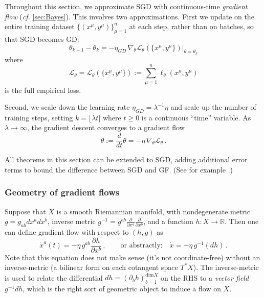 \documentclass[11pt]{article}
\newcommand{\R}{\mathbb{R}}
\newcommand{\CL}{{\mathcal L}}
\begin{document}
Throughout this section, we approximate SGD with continuous-time \emph{gradient flow} (\emph{cf.} \cref{sec:Bayes}). This involves two approximations. First we update on the entire training dataset $\{(x^\mu,y^\mu)\}_{\mu=1}^n$ at each step, rather than on batches, so that SGD becomes GD:
%
\begin{equation}
    \theta_{k+1} - \theta_k = -  \eta_{GD}\, \nabla_\theta \CL_\theta(\{x^\mu,y^\mu\}) \big|_{\theta=\theta_k}
\end{equation}
%
where
%
\begin{equation} \CL_\theta = \CL_\theta(\{x^\mu,y^\mu\}) := \sum_{\mu=1}^n \ell_\theta(x^\mu,y^\mu) \label{ell} \end{equation}
%
is the full empirical loss.

Second, we scale down the learning rate $\eta_{GD}=\lambda^{-1}\eta$ and scale up the number of training steps, setting $k = \lfloor \lambda t]$ where $t\geq 0$ is a continuous ``time'' variable. As $\lambda\to\infty$, the gradient descent converges to a gradient flow
%
\begin{equation}
    \dot\theta := \frac{d}{dt} \theta = - \eta\, \nabla_\theta \CL_\theta\,.
\end{equation}

All theorems in this section can be extended to SGD, adding additional error terms to bound the difference between SGD and GF. (See for example \cite[Chapter 19]{spiliopoulos2025foundations}.)

\subsubsection{Geometry of gradient flows}
\label{sec:geom-grads}

Suppose that $X$ is a smooth Riemannian manifold, with nondegenerate metric $g = g_{ab}dx^a dx^b$, inverse metric $g^{-1} = g^{ab}\frac{\partial}{\partial x^a}\frac{\partial}{\partial x^b}$, and a function $h:X\to \R$. Then one can define gradient flow with respect to $(h,g)$ as
%
\begin{equation} \dot x^a(t) = -\eta\, g^{ab} \frac{\partial h}{\partial x^b}\,, \qquad \text{or abstractly:}\quad \dot x = -\eta\, g^{-1}(dh) \,. \label{GF} \end{equation}
%
Note that this equation does not make sense (it's not coordinate-free) without an inverse-metric (a bilinear form on each cotangent space $T^*X$). The inverse-metric is used to relate the differential $dh = (\partial_b h)_{b=1}^{\text{dim} X}$ on the RHS to a \emph{vector field} $g^{-1}dh$, which is the right sort of geometric object to induce a flow on $X$.
\end{document}
